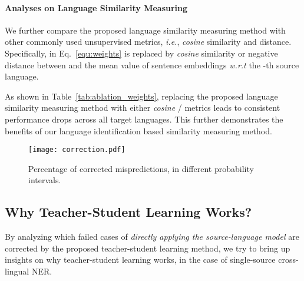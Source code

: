 \documentclass[11pt,a4paper]{article}
\newcommand\ie{\textit{i.e.}}
\newcommand\wrt{\textit{w.r.t}}
\begin{document}
	\begin{table}[t]
		\centering
		\setlength{\tabcolsep}{1.5mm}
		\caption{Comparison between the proposed language similarity measuring method and the commonly used  metrics for multi-source cross-lingual NER.}
		\label{tab:ablation_weights}
	\end{table}

	\paragraph{Analyses on Language Similarity Measuring}
	We further compare the proposed language similarity measuring method with other commonly used unsupervised metrics, \ie, \textit{cosine} similarity and  distance. Specifically,  in Eq.~\ref{equ:weights} is replaced by \textit{cosine} similarity or negative  distance between  and the mean value of sentence embeddings \wrt{} the -th source language. 

	As shown in Table~\ref{tab:ablation_weights}, replacing the proposed language similarity measuring method with either \textit{cosine} /  metrics leads to consistent performance drops across all target languages. This further demonstrates the benefits of our language identification based similarity measuring method. 

	\begin{figure}[t]
		\centering
		\texttt{[image: correction.pdf]}
		\caption{Percentage of corrected mispredictions, in different probability intervals.}
		\label{fig:correction}
	\end{figure}

	\subsection{Why Teacher-Student Learning Works?}
	\label{sec:case_study}
	By analyzing which failed cases of \emph{directly applying the source-language model} are corrected by the proposed teacher-student learning method, we try to bring up insights on why teacher-student learning works, in the case of single-source cross-lingual NER.
\end{document}

